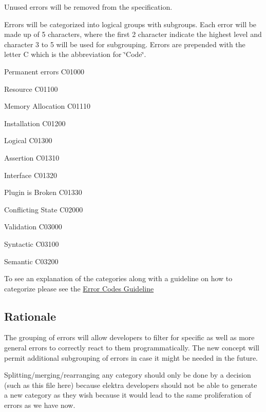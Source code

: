 Unused errors will be removed from the specification.

Errors will be categorized into logical groups with subgroups. Each error will be made up of 5 characters, where the first 2 character indicate the highest level and character 3 to 5 will be used for subgrouping. Errors are prepended with the letter {\ttfamily C} which is the abbreviation for \char`\"{}\+Code\char`\"{}.


\begin{DoxyItemize}
\item Permanent errors C01000
\begin{DoxyItemize}
\item Resource C01100
\begin{DoxyItemize}
\item Memory Allocation C01110
\end{DoxyItemize}
\item Installation C01200
\item Logical C01300
\begin{DoxyItemize}
\item Assertion C01310
\item Interface C01320
\item Plugin is Broken C01330
\end{DoxyItemize}
\end{DoxyItemize}
\item Conflicting State C02000
\item Validation C03000
\begin{DoxyItemize}
\item Syntactic C03100
\item Semantic C03200
\end{DoxyItemize}
\end{DoxyItemize}

To see an explanation of the categories along with a guideline on how to categorize please see the \hyperlink{doc_dev_error-categorization_md}{Error Codes Guideline}

\subsection*{Rationale}

The grouping of errors will allow developers to filter for specific as well as more general errors to correctly react to them programmatically. The new concept will permit additional subgrouping of errors in case it might be needed in the future.

Splitting/merging/rearranging any category should only be done by a decision (such as this file here) because elektra developers should not be able to generate a new category as they wish because it would lead to the same proliferation of errors as we have now.

